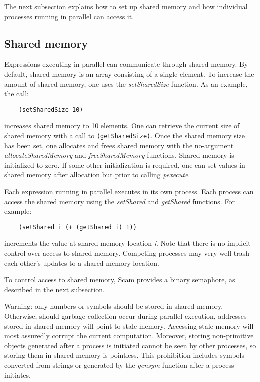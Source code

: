 The next subsection explains how to set up shared
memory and how individual processes running in parallel can access
it.

\subsection{Shared memory}

Expressions executing in parallel can communicate through shared memory.
By default, shared memory is an array consisting of a single element.
To increase the amount of shared memory, one uses the {\it setSharedSize}
function.
As an example, the call:

\begin{verbatim}
    (setSharedSize 10)
\end{verbatim}

increases shared memory to 10 elements. One can retrieve the current size of
shared memory with a call to \verb!(getSharedSize)!.
Once the shared memory size has been set, one allocates and frees
shared memory with the no-argument {\it allocateSharedMemory}
and {\it freeSharedMemory}
functions.
Shared memory is initialized to zero. If some other initialization is
required, one can set values in shared memory after allocation but prior
to calling {\it pexecute}.

Each expression running in parallel executes in its own
process. Each process
can access the shared memory using the {\it setShared} and {\it getShared}
functions.  For example:

\begin{verbatim}
    (setShared i (+ (getShared i) 1))
\end{verbatim}

increments the value at shared memory location {\it i}. Note that there
is no implicit control over access to shared memory. Competing processes
may very well trash each other's updates to a shared memory location.

To control access to shared memory,
Scam provides a binary semaphore, as described
in the next subsection.

\color{red}
Warning:
\color{black}
only numbers or symbols should be stored in shared memory.
Otherwise, should garbage collection occur during parallel execution,
addresses stored in shared memory will point to stale memory.
Accessing stale memory
will most assuredly corrupt the current computation.
Moreover, storing non-primitive objects generated after a process 
is initiated cannot 
be seen by other processes, so storing them
in shared memory is pointless.
This prohibition includes symbols converted from strings or generated by the
{\it gensym} function after a process initiates.

